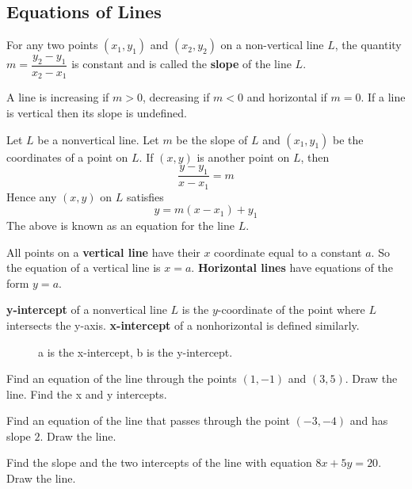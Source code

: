 \documentclass[calc1-main.tex]{subfiles}
\begin{document}
  \subsection*{Equations of Lines}
  For any two points $(x_1, y_1)$ and $(x_2, y_2)$ on a non-vertical line $L$, the quantity $m=\dfrac{y_2-y_1}{x_2-x_1}$ is constant and is called the \textbf{slope} of the line $L$.

  A line is increasing if $m>0$, decreasing if $m<0$ and horizontal if $m=0$. If a line is vertical then its slope is undefined.

  Let $L$ be a nonvertical line. Let $m$ be the slope of $L$ and $(x_1, y_1)$ be the coordinates of a point on $L$. If $(x,y)$ is another point on $L$, then
  \[
    \frac{y-y_1}{x-x_1} = m
  \]
  Hence any $(x,y)$ on $L$ satisfies
  \[
    y = m(x-x_1) + y_1
  \]
  The above is known as an equation for the line $L$.

  All points on a \textbf{vertical line} have their $x$ coordinate equal to a constant $a$. So the equation of a vertical line is $x=a$. \textbf{Horizontal lines} have equations of the form $y=a$.

  \begin{minipage}{0.5\textwidth}
    \textbf{y-intercept} of a nonvertical line $L$ is the $y$-coordinate of the point where $L$ intersects the y-axis. \textbf{x-intercept} of a nonhorizontal is defined similarly.
  \end{minipage}%
  \begin{minipage}{0.5\textwidth}
    \begin{figure}[H]
      \centering
      
      \caption{a is the x-intercept, b is the y-intercept.}
    \end{figure}
  \end{minipage}

  \begin{example}
    Find an equation of the line through the points $(1,-1)$ and $(3,5)$. Draw the line. Find the x and y intercepts.
  \end{example}

  \begin{example}
    Find an equation of the line that passes through the point $(-3,-4) $ and has slope $2$. Draw the line.
  \end{example}

  \begin{example}
    Find the slope and the two intercepts of the line with equation $8x+5y=20$. Draw the line.
  \end{example}
\end{document}
